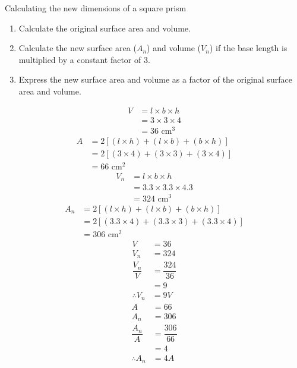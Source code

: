 \begin{wex}{Calculating the new dimensions of a square prism}
{\begin{enumerate}[noitemsep, label=\textbf{\arabic*}. ] 
 \item Calculate the original surface area and volume.
\item Calculate the new surface area ($A_n$) and volume ($V_n$) if the base length is multiplied by a constant factor of $3$.
\item Express the new surface area and volume as a factor of the original surface area and volume.
\end{enumerate}
}
{
\begin{align*}
V&=l\times b\times h\\
&=3\times3\times4\\
&= 36\mbox{ cm}^3
\end{align*}
\begin{align*}
A &= 2[(l \times h) + (l \times b) + (b \times h)]\\
&= 2[(3 \times 4) + (3 \times 3) + (3 \times 4)]\\
&= 66 \mbox{ cm}^2
\end{align*}
\begin{align*}
V_n&=l\times b \times h\\
&=3.3\times3.3\times4.3\\
&= 324\mbox{ cm}^3
\end{align*}
\begin{align*}
A_n &= 2[(l \times h) + (l \times b) + (b \times h)]\\
&= 2[(3.3 \times 4) + (3.3 \times 3) + (3.3 \times 4)]\\
&= 306 \mbox{ cm}^2
\end{align*}
\begin{align*}
V&=36\\
V_n&= 324\\
\dfrac{V_n}{V} &=\dfrac{324}{36}\\
&=9\\
\therefore V_n&=9V
\end{align*}
\begin{align*}
A &= 66 \\
A_n&= 306\\
\dfrac{A_n}{A} &=\dfrac{306}{66}\\
&=4\\
\therefore A_n&= 4A
\end{align*}
}
\end{wex}

